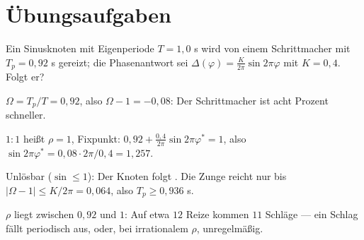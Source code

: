 \section{Übungsaufgaben}

\begin{aufgabe}
Ein Sinusknoten mit Eigenperiode $T = 1{,}0$ s wird von einem Schrittmacher mit $T_p = 0{,}92$ s gereizt; die Phasenantwort sei $\Delta(\varphi) = \frac{K}{2\pi}\sin2\pi\varphi$ mit $K = 0{,}4$. Folgt er?

\loesung
{}
$\Omega = T_p/T = 0{,}92$, also $\Omega - 1 = -0{,}08$: Der Schrittmacher ist acht Prozent schneller.

$1\!:\!1$ heißt $\rho = 1$, Fixpunkt: $0{,}92 + \frac{0{,}4}{2\pi}\sin2\pi\varphi^{*} = 1$, also $\sin2\pi\varphi^{*} = 0{,}08\cdot2\pi/0{,}4 = 1{,}257$.

Unlösbar ($\sin \le 1$): Der Knoten folgt . Die Zunge reicht nur bis $|\Omega - 1| \le K/2\pi = 0{,}064$, also $T_p \ge 0{,}936$ s.

$\rho$ liegt zwischen $0{,}92$ und $1$: Auf etwa $12$ Reize kommen $11$ Schläge --- ein Schlag fällt periodisch aus, oder, bei irrationalem $\rho$, unregelmäßig.

\begin{center}
\begin{minipage}{0.88\textwidth}
\end{minipage}
\end{center}
\end{aufgabe}

